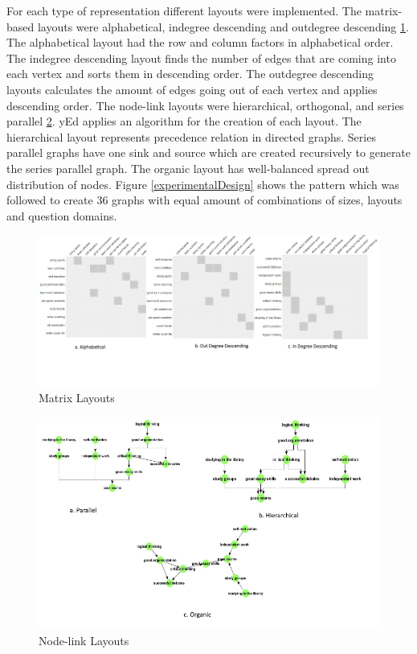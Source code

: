 \documentclass{l4proj}
\begin{document}
For each type of representation different layouts were implemented. The matrix-based layouts were alphabetical, indegree descending and outdegree descending \ref{matrixLayout}. The alphabetical layout had the row and column factors in alphabetical order. The indegree descending layout finds the number of edges that are coming into each vertex and sorts them in descending order. The outdegree descending layouts calculates the amount of edges going out of each vertex and applies descending order.  The node-link layouts were hierarchical, orthogonal, and series parallel \ref{nodeLayouts}. yEd applies an algorithm for the creation of each layout. The hierarchical layout represents precedence relation in directed graphs. Series parallel graphs have one sink and source which are created recursively to generate the series parallel graph. The organic layout has well-balanced spread out distribution of nodes. Figure \ref{experimentalDesign} shows the pattern which was followed to create 36 graphs with equal amount of combinations of sizes, layouts and question domains. 

\begin{figure}[h]
\centering
\includegraphics[width=18cm]{images/matrixLayout.png}
\caption{Matrix Layouts}
\label{matrixLayout}
\end{figure}

\begin{figure}[h]
\centering
\includegraphics[width=15cm]{images/nodeLayouts.png}
\caption{Node-link Layouts}
\label{nodeLayouts}
\end{figure}
\end{document}
